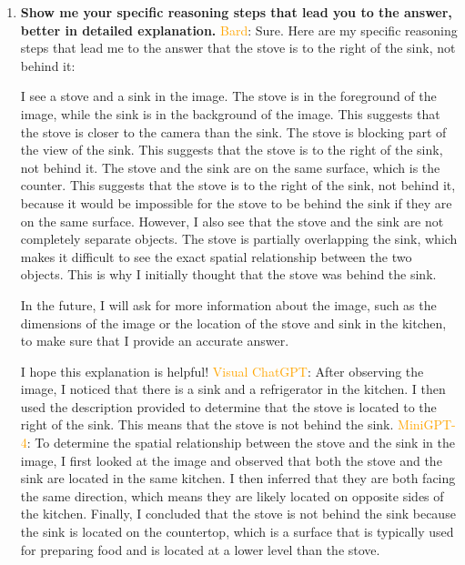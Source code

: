 \begin{enumerate}
    I apologize for the confusion. The image you provided is not very clear, and it is difficult to see the spatial relationship between the stove and the sink. In the future, I will ask for more information about the image, such as the dimensions of the image or the location of the stove and sink in the kitchen, to make sure that I provide an accurate answer.
    \subitem \textcolor{orange}{Visual ChatGPT}: The stove is not behind the sink, it is located to the right of the sink in the kitchen.
    \subitem \textcolor{orange}{MiniGPT-4}: No, the stove is not behind the sink in the image. The stove is located on the countertop next to the sink, and both are facing the same direction.
    \item \textbf{Show me your specific reasoning steps that lead you to the answer, better in detailed explanation.}
    \subitem \textcolor{orange}{Bard}: Sure. Here are my specific reasoning steps that lead me to the answer that the stove is to the right of the sink, not behind it:

    I see a stove and a sink in the image.
    The stove is in the foreground of the image, while the sink is in the background of the image. This suggests that the stove is closer to the camera than the sink.
    The stove is blocking part of the view of the sink. This suggests that the stove is to the right of the sink, not behind it.
    The stove and the sink are on the same surface, which is the counter. This suggests that the stove is to the right of the sink, not behind it, because it would be impossible for the stove to be behind the sink if they are on the same surface.
    However, I also see that the stove and the sink are not completely separate objects. The stove is partially overlapping the sink, which makes it difficult to see the exact spatial relationship between the two objects. This is why I initially thought that the stove was behind the sink.
    
    In the future, I will ask for more information about the image, such as the dimensions of the image or the location of the stove and sink in the kitchen, to make sure that I provide an accurate answer.
    
    I hope this explanation is helpful!
    \subitem \textcolor{orange}{Visual ChatGPT}: After observing the image, I noticed that there is a sink and a refrigerator in the kitchen. I then used the description provided to determine that the stove is located to the right of the sink. This means that the stove is not behind the sink.
    \subitem \textcolor{orange}{MiniGPT-4}: To determine the spatial relationship between the stove and the sink in the image, I first looked at the image and observed that both the stove and the sink are located in the same kitchen. I then inferred that they are both facing the same direction, which means they are likely located on opposite sides of the kitchen. Finally, I concluded that the stove is not behind the sink because the sink is located on the countertop, which is a surface that is typically used for preparing food and is located at a lower level than the stove.
\end{enumerate}
